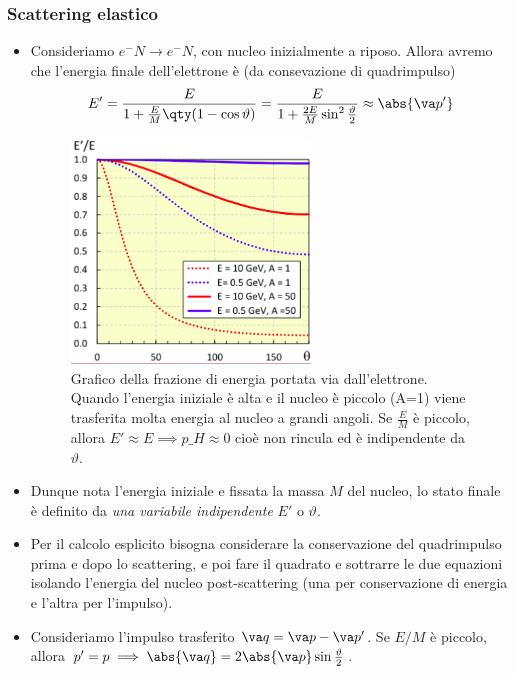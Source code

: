 \subsubsection{Scattering elastico}
\begin{itemize}
    \item Consideriamo $e^-N\to e^-N$, con nucleo inizialmente a riposo. Allora avremo che l'energia finale dell'elettrone è (da consevazione di quadrimpulso)
    \begin{equation*}
        E'=\frac E{1+\frac EM\qty(1-\cos\vartheta)}=\frac E{1+\frac{2E}{M}\sin^2\frac\vartheta2}\approx \abs{\va p'}
    \end{equation*}
    \begin{figure}[H]
        \centering
        \includegraphics[width=0.6\textwidth]{immagini/fig_frac_energy_scatt.png}
        \caption{Grafico della frazione di energia portata via dall'elettrone. Quando l'energia iniziale è alta e il nucleo è piccolo (A=1) viene trasferita molta energia al nucleo a grandi angoli. Se $\frac EM$ è piccolo, allora $E'\approx E\implies p\_H\approx0$ cioè non rincula ed è indipendente da $\vartheta$.}
    \end{figure}
    \item Dunque nota l'energia iniziale e fissata la massa $M$ del nucleo, lo stato finale è definito da \textit{una variabile indipendente} $E'$ o $\vartheta$.
    \item Per il calcolo esplicito bisogna considerare la conservazione del quadrimpulso prima e dopo lo scattering, e poi fare il quadrato e sottrarre le due equazioni isolando l'energia del nucleo post-scattering (una per conservazione di energia e l'altra per l'impulso).
    \item Consideriamo l'impulso trasferito $\va q = \va p - \va p'$. Se $E/M$ è piccolo, allora $p'=p\implies \abs{\va q}=2\abs{\va p}\sin\frac\vartheta2$. 

\end{itemize}
